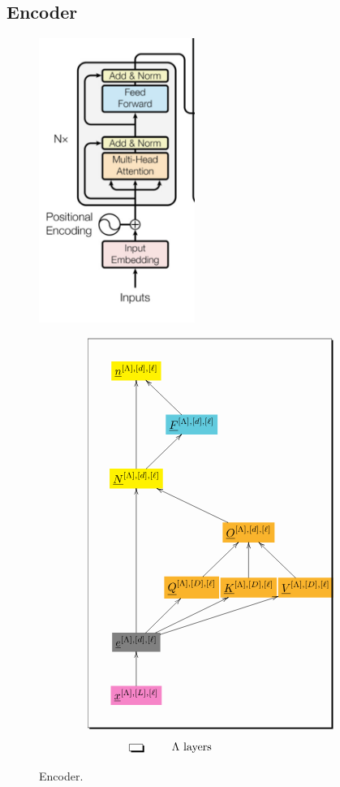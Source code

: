 \subsection{Encoder}
\begin{figure}[h!]\centering
\begin{minipage}{.4\linewidth}
\includegraphics[width=2in]{transformer/encoder.jpg}
\end{minipage}%
\begin{minipage}{.6\linewidth}
$$\xymatrix@R=2.5pc@C=0.1pc{
*+[F*:yellow]{\underline{n}^{[\Lambda],[d], [\ell]}}&&&
\\
&*+[F*:SkyBlue]{\underline{F}^{[\Lambda],[d], [\ell]}}\ar[ul]&&
\\
*+[F*:yellow]{\underline{N}^{[\Lambda],[d], [\ell]}}\ar[ur]\ar[uu]&&&
\\
&&*+[F*:Dandelion]{\underline{O}^{[\Lambda],[d], [\ell]}}\ar[ull]&
\\
&*+[F*:Dandelion]{\underline{Q}^{[\Lambda],[D], [\ell]}}\ar[ur]&*+[F*:Dandelion]{\underline{K}^{[\Lambda],[D], [\ell]}}\ar[u]&*+[F*:Dandelion]{\underline{V}^{[\Lambda],[D], [\ell]}}\ar[ul]
\\
*+[F*:gray]{\underline{e}^{[\Lambda],[d], [\ell]}}\ar[urr]\ar[uuu]\ar[ur]\ar[urrr]&&&
\\
*+[F*:Lavender]{\underline{x}^{[\Lambda],[L],[\ell]}}\ar[u]&&&
\save
\POS"1,1"."7,1"."1,4"."7,4"!C*+<4.0em>\frm{-,}
\restore
\\
*+[F-,]{\;\;}&\text{$\Lambda$ layers}
}$$
\end{minipage}
\caption{Encoder.}
\label{fig-texnn-for-encoder}
\end{figure}

